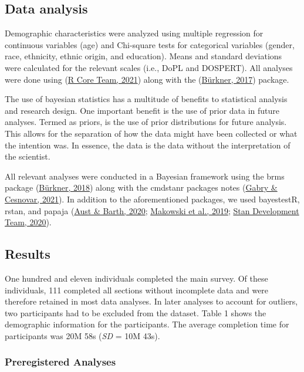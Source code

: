 \documentclass[
  donotrepeattitle,doc, 12pt, a4paper,floatsintext]{apa7}
\begin{document}
\hypertarget{data-analysis-3}{%
\subsection{Data analysis}\label{data-analysis-3}}

Demographic characteristics were analyzed using multiple regression for continuous variables (age) and Chi-square tests for categorical variables (gender, race, ethnicity, ethnic origin, and education). Means and standard deviations were calculated for the relevant scales (i.e., DoPL and DOSPERT). All analyses were done using (\protect\hyperlink{ref-rcoreteam2021}{R Core Team, 2021}) along with the (\protect\hyperlink{ref-burkner2017}{Bürkner, 2017}) package.

The use of bayesian statistics has a multitude of benefits to statistical analysis and research design. One important benefit is the use of prior data in future analyses. Termed as priors, is the use of prior distributions for future analysis. This allows for the separation of how the data might have been collected or what the intention was. In essence, the data is the data without the interpretation of the scientist.

All relevant analyses were conducted in a Bayesian framework using the brms package (\protect\hyperlink{ref-burkner2018}{Bürkner, 2018}) along with the cmdstanr packages notes (\protect\hyperlink{ref-gabry2021}{Gabry \& Cesnovar, 2021}). In addition to the aforementioned packages, we used bayestestR, rstan, and papaja (\protect\hyperlink{ref-aust2020}{Aust \& Barth, 2020}; \protect\hyperlink{ref-makowski2019}{Makowski et al., 2019}; \protect\hyperlink{ref-standevelopmentteam2020}{Stan Development Team, 2020}).

\hypertarget{results-1}{%
\subsection{Results}\label{results-1}}

One hundred and eleven individuals completed the main survey. Of these individuals, 111 completed all sections without incomplete data and were therefore retained in most data analyses. In later analyses to account for outliers, two participants had to be excluded from the dataset. Table 1 shows the demographic information for the participants. The average completion time for participants was 20M 58s (\emph{SD} = 10M 43s).

\hypertarget{preregistered-analyses-1}{%
\subsubsection{Preregistered Analyses}\label{preregistered-analyses-1}}
\end{document}
